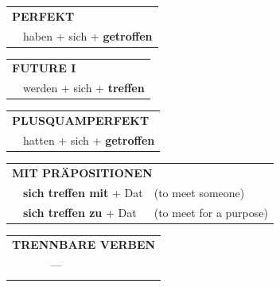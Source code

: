 \documentclass[10pt,a4paper]{revtex4-2}
\begin{document}
\begin{verbbox-acc}
 \begin{tabular}{rl}
     \multicolumn{2}{l}{\textbf{PERFEKT}}\\
    &haben + sich + \textbf{getroffen}\\
  \end{tabular}
\hfill
   \begin{tabular}{rl}
   
    \multicolumn{2}{l}{\textbf{FUTURE I} }\\
    &werden + sich + \textbf{treffen}\\
 
  \end{tabular}
\hfill
   \begin{tabular}{rl}
      \multicolumn{2}{l}{\textbf{PLUSQUAMPERFEKT}}\\
    &hatten + sich + \textbf{getroffen}\\
  \end{tabular}
  
\vspace{10pt}

   \begin{tabular}{lll}
      \multicolumn{3}{l}{\textbf{MIT PRÄPOSITIONEN}}\\
& \textbf{sich treffen mit} + Dat & (to meet someone)\\
& \textbf{sich treffen zu} + Dat & (to meet for a purpose)\\
  \end{tabular}
  \hfill
   \begin{tabular}{lll}
      \multicolumn{3}{l}{\textbf{TRENNBARE VERBEN}}\\
      & --- & \\
\vspace{10pt}
 \end{tabular}


 
  
  \vspace{-5pt}


\end{verbbox-acc}
\end{document}
